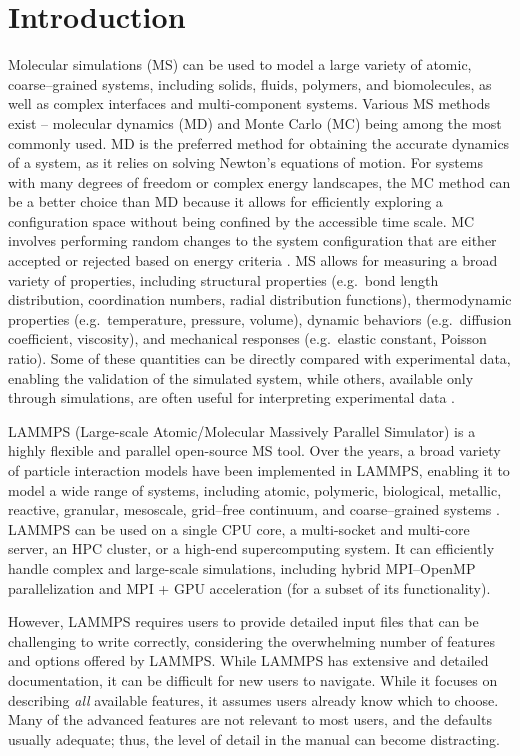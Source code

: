 \documentclass[9pt,tutorial]{livecoms}
\begin{document}
\section{Introduction}

Molecular simulations (MS) can be used to model a large variety of
atomic, coarse--grained systems, including solids, fluids, polymers, and
biomolecules, as well as complex interfaces and multi-component systems.
Various MS methods exist -- molecular dynamics (MD) and Monte Carlo (MC)
being among the most commonly used.  MD is the preferred method for
obtaining the accurate dynamics of a system, as it relies on solving
Newton's equations of motion.  For systems with many degrees of freedom
or complex energy landscapes, the MC method can be a better choice than
MD because it allows for efficiently exploring a configuration space
without being confined by the accessible time scale.  MC involves
performing random changes to the system configuration that are either
accepted or rejected based on energy criteria
\cite{frenkel2023understanding, allen2017computer}.  MS allows for
measuring a broad variety of properties, including structural properties
(e.g.~bond length distribution, coordination numbers, radial
distribution functions), thermodynamic properties (e.g.~temperature,
pressure, volume), dynamic behaviors (e.g.~diffusion coefficient,
viscosity), and mechanical responses (e.g.~elastic constant, Poisson
ratio).  Some of these quantities can be directly compared with
experimental data, enabling the validation of the simulated system,
while others, available only through simulations, are often useful for
interpreting experimental data \cite{van2008molecular}.

LAMMPS (Large-scale Atomic/Molecular Massively Parallel Simulator)
\cite{lammps_home} is a highly flexible and parallel open-source MS
tool.  Over the years, a broad variety of particle interaction models
have been implemented in LAMMPS, enabling it to model a wide range of
systems, including atomic, polymeric, biological, metallic, reactive, granular,
mesoscale, grid--free continuum, and coarse--grained systems
\cite{thompson2022lammps}.  LAMMPS can be used on a single CPU core, a
multi-socket and multi-core server, an HPC cluster, or a high-end
supercomputing system.  It can efficiently handle complex and large-scale
simulations, including hybrid MPI--OpenMP parallelization
and MPI + GPU acceleration (for a subset of its functionality).

However, LAMMPS requires users to provide detailed input files that can
be challenging to write correctly, considering the overwhelming number
of features and options offered by LAMMPS.  While LAMMPS has
extensive and detailed documentation, it can be difficult for new users
to navigate.  While it focuses on describing \emph{all} available
features, it assumes users already know which to choose.  Many of
the advanced features are not relevant to most users, and the defaults
usually adequate; thus, the level of detail in the manual can become
distracting.
\end{document}
